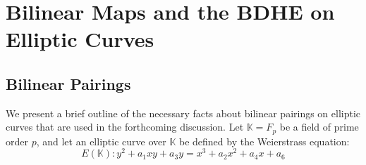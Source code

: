 \appendix


% 






\section{Bilinear Maps and the BDHE on Elliptic Curves}
\label{app_sec:prelims}

\subsection{Bilinear Pairings}

We  present a brief outline of the necessary facts about bilinear pairings on elliptic curves that are used in the forthcoming discussion. Let $\mathbb{K}=F_{p}$ be a field of prime order $p$, and let an elliptic curve over $\mathbb{K}$ be defined by the Weierstrass \cite{miller1986use} equation:
\begin{equation*}
 E(\mathbb{K}) : y^2 + a_1xy + a_3y = x^3 + a_2x^2 + a_4x + a_6
\end{equation*}

